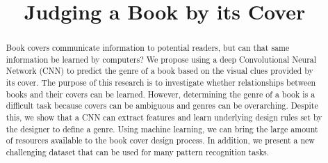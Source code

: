 \documentclass[conference]{IEEEtran}
\begin{document}
\title{Judging a Book by its Cover}




\author{
 }













\maketitle

\begin{abstract}
Book covers communicate information to potential readers, but can that same information be learned by computers? We propose using a deep Convolutional Neural Network (CNN) to predict the genre of a book based on the visual clues provided by its cover. The purpose of this research is to investigate whether relationships between books and their covers can be learned. However, determining the genre of a book is a difficult task because covers can be ambiguous and genres can be overarching. Despite this, we show that a CNN can extract features and learn underlying design rules set by the designer to define a genre. Using machine learning, we can bring the large amount of resources available to the book cover design process. In addition, we present a new challenging dataset that can be used for many pattern recognition tasks.
\end{abstract}




\IEEEpeerreviewmaketitle
\end{document}
